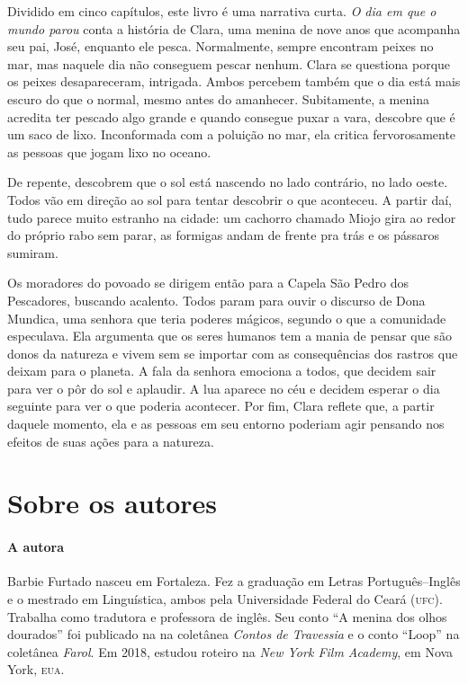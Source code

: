 \documentclass[11pt]{extarticle}
\begin{document}
Dividido em cinco capítulos, este livro é uma narrativa curta. \textit{O dia em que o mundo parou} conta a história de Clara, uma menina de nove anos que acompanha seu pai, José, enquanto ele pesca. Normalmente, sempre encontram peixes no mar, mas naquele dia não conseguem pescar nenhum. Clara se questiona porque os peixes desapareceram, intrigada. Ambos percebem também que o dia está mais escuro do que o normal, mesmo antes do amanhecer. Subitamente, a menina acredita ter pescado algo grande e quando consegue puxar a vara, descobre que é um saco de lixo. Inconformada com a poluição no mar, ela critica fervorosamente as pessoas que jogam lixo no oceano. 

De repente, descobrem que o sol está nascendo no lado contrário, no lado oeste. Todos vão em direção ao sol para tentar descobrir o que aconteceu. A partir daí, tudo parece muito estranho na cidade: um cachorro chamado Miojo gira ao redor do próprio rabo sem parar, as formigas andam de frente pra trás e os pássaros sumiram.

Os moradores do povoado se dirigem então para a Capela São Pedro dos Pescadores, buscando acalento. Todos param para ouvir o discurso de Dona Mundica, uma senhora que teria poderes mágicos, segundo o que a comunidade especulava. Ela argumenta que os seres humanos tem a mania de pensar que são donos da natureza e vivem sem se importar com as consequências dos rastros que deixam para o planeta. A fala da senhora emociona a todos, que decidem sair para ver o pôr do sol e aplaudir. A lua aparece no céu e decidem esperar o dia seguinte para ver o que poderia acontecer. Por fim, Clara reflete que, a partir daquele momento, ela e as pessoas em seu entorno poderiam agir pensando nos efeitos de suas ações para a natureza.

\section{Sobre os autores}

\paragraph{A autora} Barbie Furtado nasceu em Fortaleza. Fez a graduação em Letras Português--Inglês e o mestrado em Linguística, ambos pela Universidade Federal do Ceará (\textsc{ufc}). Trabalha como tradutora e professora de inglês. Seu conto ``A menina dos olhos dourados'' foi publicado na na coletânea \textit{Contos de Travessia} e o conto ``Loop'' na coletânea \textit{Farol}. Em 2018, estudou roteiro na \textit{New York Film Academy}, em Nova York, \textsc{eua}. 
\end{document}
